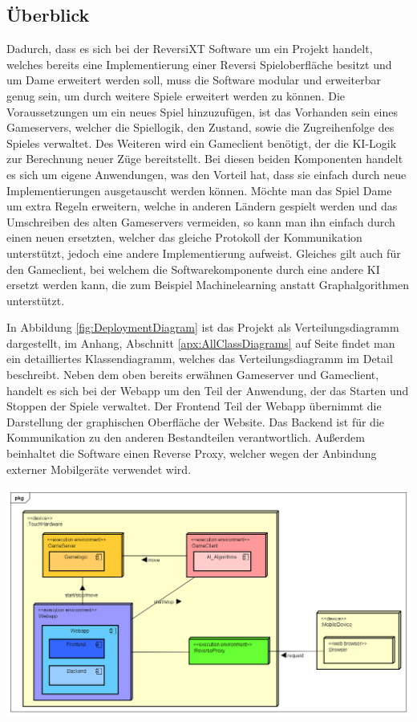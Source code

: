 \documentclass[12pt,a4paper,bibliography=totocnumbered,listof=totocnumbered]{article}
\begin{document}
\subsection{Überblick}
Dadurch, dass es sich bei der ReversiXT Software um ein Projekt handelt, welches bereits eine Implementierung einer Reversi Spieloberfläche besitzt und 
um Dame erweitert werden soll, muss die Software modular und erweiterbar genug sein, um durch weitere Spiele erweitert werden zu können.
Die Voraussetzungen um ein neues Spiel hinzuzufügen, ist das Vorhanden sein eines Gameservers, welcher die Spiellogik, 
den Zustand, sowie die Zugreihenfolge des Spieles verwaltet. Des Weiteren wird ein Gameclient benötigt, der die KI-Logik zur Berechnung
neuer Züge bereitstellt. Bei diesen beiden Komponenten handelt es sich um eigene Anwendungen, was den Vorteil hat, dass sie einfach 
durch neue Implementierungen ausgetauscht werden können. Möchte man das Spiel Dame um extra Regeln erweitern, welche in anderen Ländern gespielt werden
und das Umschreiben des alten Gameservers vermeiden, so kann man ihn einfach durch einen neuen ersetzten, welcher das gleiche Protokoll der Kommunikation 
unterstützt, jedoch eine andere Implementierung aufweist. Gleiches gilt auch für den Gameclient, bei welchem die Softwarekomponente durch 
eine andere KI ersetzt werden kann, die zum Beispiel Machinelearning anstatt Graphalgorithmen unterstützt. 

In Abbildung \ref{fig:DeploymentDiagram} ist das Projekt als Verteilungsdiagramm dargestellt, im Anhang, Abschnitt \ref{apx:AllClassDiagrams} auf Seite \pageref{apx:AllClassDiagrams}
findet man ein detailliertes Klassendiagramm, welches das Verteilungsdiagramm im Detail beschreibt. 
Neben dem oben bereits erwähnen Gameserver und Gameclient, handelt es sich bei der Webapp um den Teil der Anwendung, der das Starten und Stoppen der Spiele verwaltet.
Der Frontend Teil der Webapp übernimmt die Darstellung der graphischen Oberfläche der Website. Das Backend ist für die Kommunikation zu den anderen 
Bestandteilen verantwortlich. Außerdem beinhaltet die Software einen Reverse Proxy, welcher wegen der Anbindung externer Mobilgeräte verwendet wird.

\vspace{1em}
\begin{minipage}{\linewidth}
	\centering
	\includegraphics[width=1.0\linewidth]{pics/DeploymentDiagram.png}
	\label{fig:DeploymentDiagram}
\end{minipage}
\end{document}
